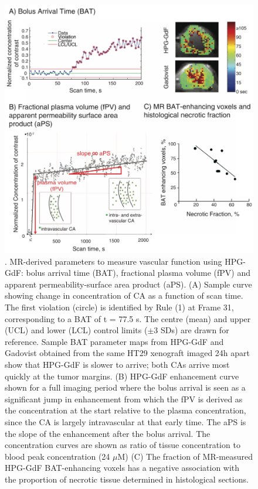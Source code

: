 \begin{figure}[htbp]   
 \begin{center}  
 \includegraphics[width=\textwidth]{hpg/hpg-paper1-images/hpg_fig2-bat.png}
 \caption{. MR-derived parameters to measure vascular function using HPG-GdF: bolus arrival time (BAT), fractional plasma volume (fPV) and apparent permeability-surface area product (aPS). (A) Sample curve showing change in concentration of CA as a function of scan time. The first violation (circle) is identified by Rule (1) at Frame 31, corresponding to a BAT of t = 77.5 s. The centre (mean) and upper (UCL) and lower (LCL) control limits ($\pm$3 SDs) are drawn for reference. Sample BAT parameter maps from HPG-GdF and Gadovist obtained from the same HT29 xenograft imaged 24h apart show that HPG-GdF is slower to arrive; both CAs arrive most quickly at the tumor margins. (B) HPG-GdF enhancement curve shown for a full imaging period where the bolus arrival is seen as a significant jump in enhancement from which the fPV is derived as the concentration at the start relative to the plasma concentration, since the CA is largely intravascular at that early time. The aPS is the slope of the enhancement after the bolus arrival. The concentration curves are shown as ratio of tissue concentration to blood peak concentration (24 $\mu$M) (C) The fraction of MR-measured HPG-GdF BAT-enhancing voxels has a negative association with the proportion of necrotic tissue determined in histological sections.}  
 \label{hpgpaper1:fig2}  
 \end{center}
\end{figure}

